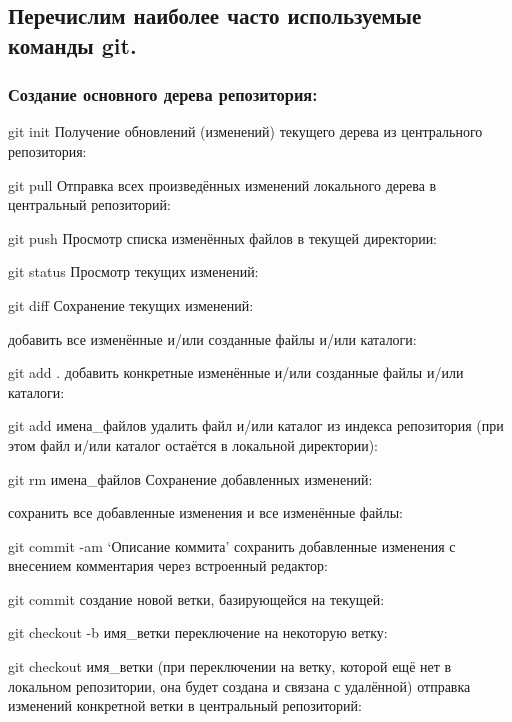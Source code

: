 \documentclass[
  english,
  russian,
  12pt,
  a4paper,
  DIV=11,
  numbers=noendperiod]{scrreprt}
\begin{document}
\subsection{Перечислим наиболее часто используемые команды
git.}\label{ux43fux435ux440ux435ux447ux438ux441ux43bux438ux43c-ux43dux430ux438ux431ux43eux43bux435ux435-ux447ux430ux441ux442ux43e-ux438ux441ux43fux43eux43bux44cux437ux443ux435ux43cux44bux435-ux43aux43eux43cux430ux43dux434ux44b-git.}

\subsubsection{Создание основного дерева
репозитория:}\label{ux441ux43eux437ux434ux430ux43dux438ux435-ux43eux441ux43dux43eux432ux43dux43eux433ux43e-ux434ux435ux440ux435ux432ux430-ux440ux435ux43fux43eux437ux438ux442ux43eux440ux438ux44f}

git init Получение обновлений (изменений) текущего дерева из
центрального репозитория:

git pull Отправка всех произведённых изменений локального дерева в
центральный репозиторий:

git push Просмотр списка изменённых файлов в текущей директории:

git status Просмотр текущих изменений:

git diff Сохранение текущих изменений:

добавить все изменённые и/или созданные файлы и/или каталоги:

git add . добавить конкретные изменённые и/или созданные файлы и/или
каталоги:

git add имена\_файлов удалить файл и/или каталог из индекса репозитория
(при этом файл и/или каталог остаётся в локальной директории):

git rm имена\_файлов Сохранение добавленных изменений:

сохранить все добавленные изменения и все изменённые файлы:

git commit -am \enquote*{Описание коммита} сохранить добавленные
изменения с внесением комментария через встроенный редактор:

git commit создание новой ветки, базирующейся на текущей:

git checkout -b имя\_ветки переключение на некоторую ветку:

git checkout имя\_ветки (при переключении на ветку, которой ещё нет в
локальном репозитории, она будет создана и связана с удалённой) отправка
изменений конкретной ветки в центральный репозиторий:
\end{document}
